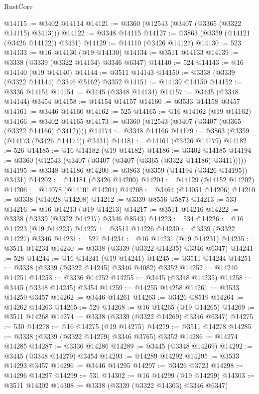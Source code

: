 \begin{lexlean}{RustCore}
\begin{coremodule}
@14115 := @3402 @14114
@14121 := @3360 (@12543 (@3407 (@3365 (@3322 @14115) @3413)))
@14122 := @3348 @14115
@14127 := @3863 (@3359 (@14121 (@3426 @14122)) @3431)
@14129 := @14110 (@3426 @14127)
@14130 := 523
@14133 := @16 @14130 (@19 @14130)
@14134 := @3511 @14133
@14139 := @3338 (@3339 (@3322 @14134) @3346 @6347)
@14140 := 524
@14143 := @16 @14140 (@19 @14140)
@14144 := @3511 @14143
@14150 := @3338 (@3339 (@3322 @14144) @3346 @5162) @3352
@14151 := @14139 @14150
@14152 := @3336 @14151
@14154 := @3445 (@3348 @14134)
@14157 := @3445 (@3348 @14144) @3454
@14158 := @14154 @14157
@14160 := @3533 @14158 @3457
@14161 := @3446 @14160
@14162 := 525
@14165 := @16 @14162 (@19 @14162)
@14166 := @3402 @14165
@14173 := @3360 (@12543 (@3407 (@3407 (@3365 (@3322 @14166) @3412))))
@14174 := @3348 @14166
@14179 := @3863 (@3359 (@14173 (@3426 @14174)) @3431)
@14181 := @14161 (@3426 @14179)
@14182 := 526
@14185 := @16 @14182 (@19 @14182)
@14186 := @3402 @14185
@14194 := @3360 (@12543 (@3407 (@3407 (@3407 (@3365 (@3322 @14186) @3411)))))
@14195 := @3348 @14186
@14200 := @3863 (@3359 (@14194 (@3426 @14195)) @3431)
@14202 := @14181 (@3426 @14200)
@14204 := @14129 (@14152 @14202)
@14206 := @14078 (@14101 @14204)
@14208 := @3464 (@14051 @14206)
@14210 := @3338 (@14028 @14208)
@14212 := @3339 @8556 @5873
@14213 := 533
@14216 := @16 @14213 (@19 @14213)
@14217 := @3511 @14216
@14222 := @3338 (@3339 (@3322 @14217) @3346 @8543)
@14223 := 534
@14226 := @16 @14223 (@19 @14223)
@14227 := @3511 @14226
@14230 := @3339 (@3322 @14227) @3346
@14231 := 527
@14234 := @16 @14231 (@19 @14231)
@14235 := @3511 @14234
@14240 := @3338 (@3339 (@3322 @14235) @3346 @6347)
@14241 := 528
@14244 := @16 @14241 (@19 @14241)
@14245 := @3511 @14244
@14251 := @3338 (@3339 (@3322 @14245) @3346 @4082) @3352
@14252 := @14240 @14251
@14253 := @3336 @14252
@14255 := @3445 (@3348 @14235)
@14258 := @3445 (@3348 @14245) @3454
@14259 := @14255 @14258
@14261 := @3533 @14259 @3457
@14262 := @3446 @14261
@14263 := @3426 @8519
@14264 := @14262 @14263
@14265 := 529
@14268 := @16 @14265 (@19 @14265)
@14269 := @3511 @14268
@14274 := @3338 (@3339 (@3322 @14269) @3346 @6347)
@14275 := 530
@14278 := @16 @14275 (@19 @14275)
@14279 := @3511 @14278
@14285 := @3338 (@3339 (@3322 @14279) @3346 @3765) @3352
@14286 := @14274 @14285
@14287 := @3336 @14286
@14289 := @3445 (@3348 @14269)
@14292 := @3445 (@3348 @14279) @3454
@14293 := @14289 @14292
@14295 := @3533 @14293 @3457
@14296 := @3446 @14295
@14297 := @3426 @3723
@14298 := @14296 @14297
@14299 := 531
@14302 := @16 @14299 (@19 @14299)
@14303 := @3511 @14302
@14308 := @3338 (@3339 (@3322 @14303) @3346 @6347)

\end{coremodule}
\end{lexlean}
